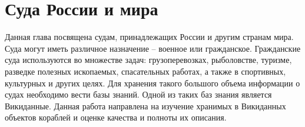 \chapter{Суда России и мира}
\label{ch:ships-chapter}

Данная глава посвящена судам, принадлежащих России и другим странам мира. Суда могут иметь различное назначение -- военное или гражданское. Гражданские суда используются во множестве задач: грузоперевозках, рыболовстве, туризме, разведке полезных ископаемых, спасательных работах, а также в спортивных, культурных и других целях. Для хранения такого большого объема информации о судах необходимо вести базы знаний. Одной из таких баз знания является Викиданные. Данная работа направлена на изучение хранимых в Викиданных объектов кораблей и оценке качества и полноты их описания.
